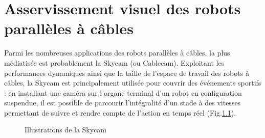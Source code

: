 \chapter{Asservissement visuel des robots parall\`eles à c\^ables}

Parmi les nombreuses applications des robots parall\`eles \`a c\^ables, la plus 
m\'ediatis\'ee est probablement la Skycam (ou Cablecam)\cite{skycam}. 
Exploitant les performances dynamiques ainsi que la taille de l'espace de 
travail des robots \`a c\^ables, la Skycam est principalement utilis\'ee pour 
couvrir des \'ev\'enements sportifs : en installant une cam\'era sur l'organe 
terminal d'un robot en configuration suspendue, il est possible de parcourir 
l'int\'egralit\'e d'un stade \`a des vitesses permettant de suivre et rendre 
compte de l'action en temps r\'eel (Fig.\ref{chapter02:fig0}).

\begin{figure}[!ht]
  \centering
\hfill
    \caption{\footnotesize{Illustrations de la Skycam}}
\label{chapter02:fig0}
\end{figure}

